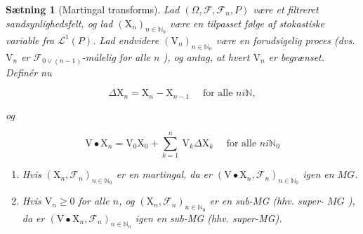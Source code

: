 \documentclass{article}
\newcommand{\1}{\mathbbm{1}}
\theoremstyle{boxed}
\newtheorem{proposition}[theorem]{Sætning}
\begin{document}
\begin{theorem-box}
    \begin{proposition}[Martingal transforms]
        Lad $\left(\Omega, \mathcal{F}, \mathcal{F}_n, P\right)$ være et filtreret sandsynlighedsfelt, og lad $\left(\mathrm{X}_n\right)_{n \in \mathbb{N}_0}$ være en tilpasset følge af stokastiske variable fra $\mathcal{L}^1(P)$.
Lad endvidere $\left(\mathrm{V}_n\right)_{n \in \mathbb{N}_0}$ være en forudsigelig proces (dvs. $\mathrm{V}_n$ er $\mathcal{F}_{0 \vee(n-1)}$-målelig for alle $n$ ), og antag, at hvert $\mathrm{V}_n$ er begrænset.
Definér nu

$$
\Delta \mathrm{X}_n=\mathrm{X}_n-\mathrm{X}_{n-1} \quad \text { for alle } n i \mathbb{N},
$$

og

$$
\mathrm{V} \bullet \mathrm{X}_n=\mathrm{V}_0 \mathrm{X}_0+\sum_{k=1}^n \mathrm{~V}_k \Delta \mathrm{X}_k \quad \text { for alle } n i \mathbb{N}_0
$$
\begin{enumerate}
    \item[\textnormal{(i)}] Hvis $\left(\mathrm{X}_n, \mathcal{F}_n\right)_{n \in \mathbb{N}_0}$ er en martingal, da er $\left(\mathrm{V} \bullet \mathrm{X}_n, \mathcal{F}_n\right)_{n \in \mathbb{N}_0}$ igen en $M G$.
    \item[\textnormal{(ii)}]  Hvis $\mathrm{V}_n \geq 0$ for alle $n$, og $\left(\mathrm{X}_n, \mathcal{F}_n\right)_{n \in \mathbb{N}_0}$ er en sub-MG (hhv. super- $M G$ ), da er $\left(\mathrm{V} \bullet \mathrm{X}_n, \mathcal{F}_n\right)_{n \in \mathbb{N}_0}$ igen en sub-MG (hhv. super-MG).

\end{enumerate}
\end{proposition}
\end{theorem-box}
\end{document}
